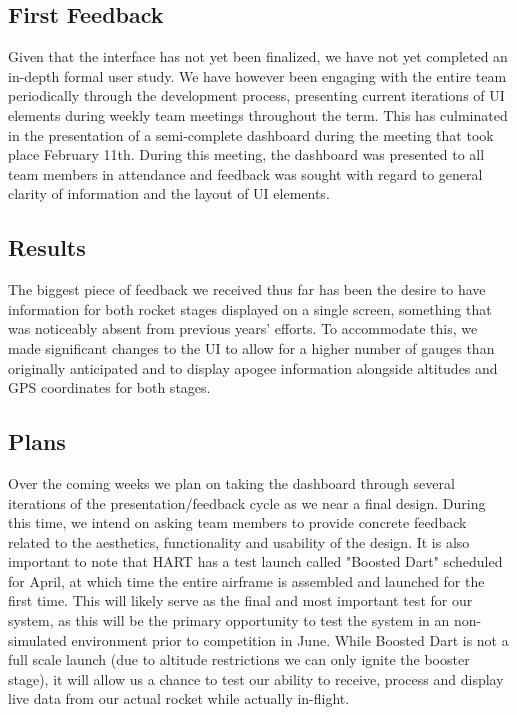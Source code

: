\documentclass[journal,10pt,onecolumn,compsoc]{IEEEtran}
\begin{document}
	\subsection{First Feedback}
		Given that the interface has not yet been finalized, we have not yet completed an in-depth formal user study.
		We have however been engaging with the entire team periodically through the development process, presenting current iterations of UI elements during weekly team meetings throughout the term.
		This has culminated in the presentation of a semi-complete dashboard during the meeting that took place February 11th.
		During this meeting, the dashboard was presented to all team members in attendance and feedback was sought with regard to general clarity of information and the layout of UI elements.
	
	\subsection{Results}
		The biggest piece of feedback we received thus far has been the desire to have information for both rocket stages displayed on a single screen, something that was noticeably absent from previous years' efforts.
		To accommodate this, we made significant changes to the UI to allow for a higher number of gauges than originally anticipated and to display apogee information alongside altitudes and GPS coordinates for both stages. 
	
	\subsection{Plans}
		Over the coming weeks we plan on taking the dashboard through several iterations of the presentation/feedback cycle as we near a final design.
		During this time, we intend on asking team members to provide concrete feedback related to the aesthetics, functionality and usability of the design.
		It is also important to note that HART has a test launch called "Boosted Dart" scheduled for April, at which time the entire airframe is assembled and launched for the first time.
		This will likely serve as the final and most important test for our system, as this will be the primary opportunity to test the system in an non-simulated environment prior to competition in June.
		While Boosted Dart is not a full scale launch (due to altitude restrictions we can only ignite the booster stage), it will allow us a chance to test our ability to receive, process and display live data from our actual rocket while actually in-flight.
		
\end{document}
